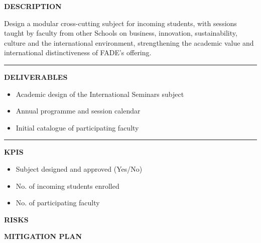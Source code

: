 \documentclass[11pt,a4paper]{scrreprt}
\newcommand{\fieldlabel}[1]{%
  {\footnotesize\sffamily\bfseries\color{mutedcolor}\MakeUppercase{#1}}\par\nopagebreak[4]
}
\newcommand{\fieldsep}{\vspace{3pt}\noindent\textcolor{bordercolor}{\rule{\linewidth}{0.4pt}}\vspace{3pt}\par}
\begin{document}
\begin{tcolorbox}[pabox={fgcolor}{A.P.3.2 \enspace\textbullet\enspace Creation of FADE International Seminars}]

\fieldlabel{Description}
{\small Design a modular cross-cutting subject for incoming students, with sessions taught by faculty from other Schools on business, innovation, sustainability, culture and the international environment, strengthening the academic value and international distinctiveness of FADE's offering. }\par
\fieldsep
\fieldlabel{Deliverables}
{\small \begin{itemize}[noitemsep,topsep=2pt]
\item Academic design of the International Seminars subject
\item Annual programme and session calendar
\item Initial catalogue of participating faculty
\end{itemize}}\par
\fieldsep
\fieldlabel{KPIs}
{\small \begin{itemize}[noitemsep,topsep=2pt]
\item Subject designed and approved (Yes/No)
\item No. of incoming students enrolled
\item No. of participating faculty
\end{itemize}}\par
\end{tcolorbox}
\begin{tcolorbox}[riskbox]
{\footnotesize\sffamily\bfseries\color{red!50!black} RISKS}\par{}
\end{tcolorbox}
\begin{tcolorbox}[mitbox]
{\footnotesize\sffamily\bfseries\color{green!40!black} MITIGATION PLAN}\par{}
\end{tcolorbox}
\vspace{8pt}
\end{document}
